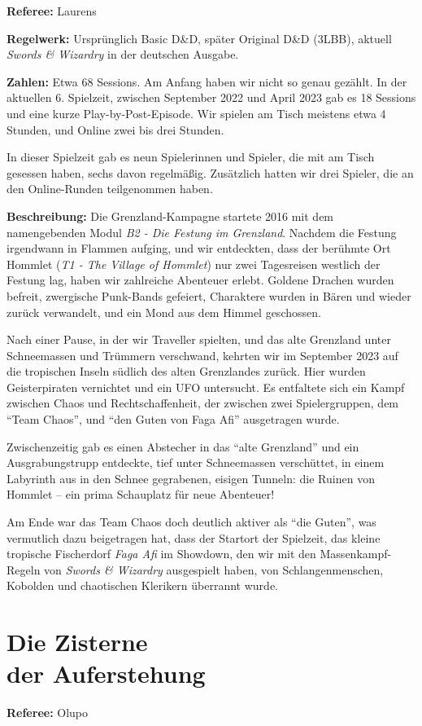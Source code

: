 \documentclass[11pt]{wbzine}
\begin{document}
\begin{multicols}{2}
\textbf{Referee:} Laurens

\textbf{Regelwerk:} Ursprünglich Basic D\&D, später Original D\&D
(3LBB),
aktuell \textit{Swords \& Wizardry} in der deutschen Ausgabe.

\textbf{Zahlen:} Etwa 68 Sessions. Am Anfang haben wir nicht so
genau gezählt. In der aktuellen 6. Spielzeit, zwischen September
2022 und April 2023 gab es 18 Sessions und eine kurze
Play-by-Post-Episode. Wir spielen am Tisch meistens etwa 4 Stunden,
und Online zwei bis drei Stunden.

In dieser Spielzeit gab es neun Spielerinnen und Spieler, die mit am
Tisch gesessen haben, sechs davon regelmäßig. Zusätzlich
hatten wir drei Spieler, die an den Online-Runden teilgenommen
haben.

\textbf{Beschreibung:} Die Grenzland-Kampagne startete 2016 mit dem
namengebenden Modul \textit{B2 - Die Festung im Grenzland}. Nachdem
die Festung irgendwann in Flammen aufging, und wir entdeckten, dass
der berühmte Ort Hommlet (\textit{T1 - The Village of Hommlet}) nur
zwei Tagesreisen westlich der Festung lag, haben wir zahlreiche
Abenteuer erlebt. Goldene Drachen wurden befreit, zwergische
Punk-Bands gefeiert, Charaktere wurden in Bären und wieder zurück
verwandelt, und ein Mond aus dem Himmel geschossen.

Nach einer Pause, in der wir Traveller spielten, und das alte
Grenzland unter Schneemassen und Trümmern verschwand, kehrten wir im
September 2023 auf die tropischen Inseln südlich des alten
Grenzlandes zurück. Hier wurden Geisterpiraten vernichtet und ein
UFO untersucht. Es entfaltete sich ein Kampf zwischen Chaos und
Rechtschaffenheit, der zwischen zwei Spielergruppen, dem ``Team
Chaos'', und ``den Guten von Faga Afi'' ausgetragen wurde. 

Zwischenzeitig gab es einen Abstecher in das ``alte Grenzland'' und
ein Ausgrabungstrupp entdeckte, tief unter Schneemassen verschüttet,
in einem Labyrinth aus in den Schnee gegrabenen, eisigen Tunneln:
die Ruinen von Hommlet -- ein prima Schauplatz für neue Abenteuer!

Am Ende war das Team Chaos doch deutlich aktiver als ``die
Guten'', was vermutlich dazu beigetragen hat, dass der Startort
der Spielzeit, das kleine tropische Fischerdorf \textit{Faga Afi} im
Showdown, den wir mit den Massenkampf-Regeln von \textit{Swords \&
Wizardry} ausgespielt haben, von Schlangenmenschen, Kobolden und 
chaotischen Klerikern überrannt wurde.

\section{Die Zisterne\\ der Auferstehung}
\label{zisterne}
\textbf{Referee:} Olupo


\end{multicols}
\end{document}
